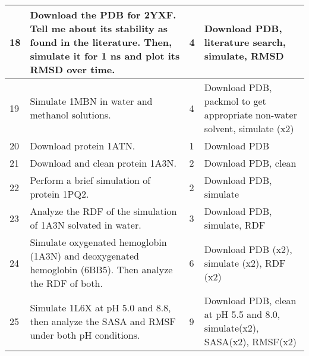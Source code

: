 \begin{longtable}[]{|p{}|p{}|p{}|p{}|}
18 & Download the PDB for 2YXF. Tell me about its stability as found in the literature. Then, simulate it for 1 ns and plot its RMSD over time. & 4 & Download PDB, literature search, simulate, RMSD \\ \hline
19 & Simulate 1MBN in water and methanol solutions. & 4 & Download PDB, packmol to get appropriate non-water solvent, simulate (x2) \\ \hline
20 & Download protein 1ATN. & 1 & Download PDB \\ \hline
21 & Download and clean protein 1A3N. & 2 & Download PDB, clean \\ \hline
22 & Perform a brief simulation of protein 1PQ2. & 2 & Download PDB, simulate \\ \hline
23 & Analyze the RDF of the simulation of 1A3N solvated in water. & 3 & Download PDB, simulate, RDF \\ \hline
24 & Simulate oxygenated hemoglobin (1A3N) and deoxygenated hemoglobin (6BB5). Then analyze the RDF of both. & 6 & Download PDB (x2), simulate (x2), RDF (x2) \\ \hline
25 & Simulate 1L6X at pH 5.0 and 8.8, then analyze the SASA and RMSF under both pH conditions. & 9 & Download PDB, clean at pH 5.5 and 8.0, simulate(x2), SASA(x2), RMSF(x2) \\ 
\bottomrule
\end{longtable}